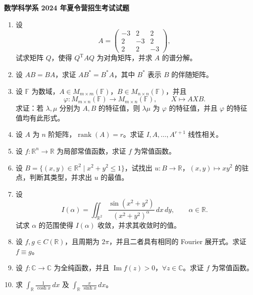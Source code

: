 \documentclass[UTF8,11pt,fontset=none]{ctexart}
\newcommand{\paperheading}[1]{\begin{center}\Large\bfseries #1\end{center}\vspace{.45em}}
\begin{document}
\paperheading{数学科学系 2024 年夏令营招生考试试题}
\begin{enumerate}
\item 设
\[
A=\begin{pmatrix}-3&2&2\\2&-3&2\\2&2&-3\end{pmatrix},
\]
试求矩阵 $Q$，使得 $Q^{\mathrm T}AQ$ 为对角矩阵，并求 $A$ 的谱分解。
\item 设 $AB=BA$，求证 $AB^*=B^*A$，其中 $B^*$ 表示 $B$ 的伴随矩阵。
\item 设 $\mathbb F$ 为数域，$A\in M_{m\times m}(\mathbb F)$，$B\in M_{n\times n}(\mathbb F)$，并且
\[
\varphi:M_{m\times n}(\mathbb F)\longrightarrow M_{m\times n}(\mathbb F),
\qquad X\longmapsto AXB.
\]
求证：若 $\lambda,\mu$ 分别为 $A,B$ 的特征值，则 $\lambda\mu$ 为 $\varphi$ 的特征值，并且 $\varphi$ 的特征值均有此形式。
\item 设 $A$ 为 $n$ 阶矩阵，$\operatorname{rank}(A)=r$。求证 $I,A,\ldots,A^{r+1}$ 线性相关。
\item 设 $f:\mathbb R^n\to\mathbb R$ 为局部常值函数，求证 $f$ 为常值函数。
\item 设 $B=\{(x,y)\in\mathbb R^2\mid x^2+y^2\le1\}$，试找出 $u:B\to\mathbb R$，$(x,y)\mapsto xy^2$ 的驻点，判断其类型，并求出 $u$ 的最值。
\item 设
\[
I(\alpha)=\iint_{\mathbb R^2}\frac{\sin(x^2+y^2)}{(x^2+y^2)^\alpha}\,dx\,dy,
\qquad \alpha\in\mathbb R.
\]
试求 $\alpha$ 的范围使得 $I(\alpha)$ 收敛，并求其收敛时的值。
\item 设 $f,g\in C(\mathbb R)$，且周期为 $2\pi$，并且二者具有相同的 Fourier 展开式。求证 $f\equiv g$。
\item 设 $f:\mathbb C\to\mathbb C$ 为全纯函数，并且 $\operatorname{Im} f(z)>0$，$\forall z\in\mathbb C$。求证 $f$ 为常值函数。
\item 求 $\displaystyle\int_{\mathbb R}\frac{1}{\cosh x}\,dx$ 及
$\displaystyle\int_{\mathbb R}\frac{x}{\sinh x}\,dx$。
\end{enumerate}
\end{document}
